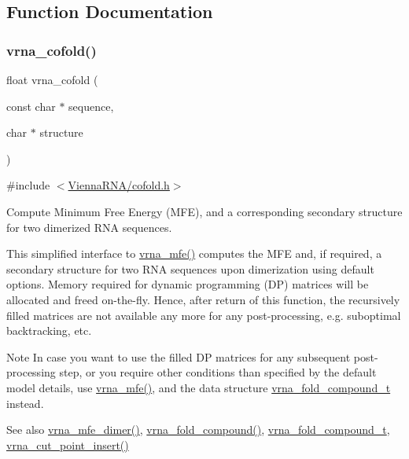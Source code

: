 \subsection{Function Documentation}
\mbox{\label{group__mfe__cofold_ga9ef3a297201dbf838a8daff2b45c0c82}} 
\subsubsection{\texorpdfstring{vrna\+\_\+cofold()}{vrna\_cofold()}}
{\footnotesize\ttfamily float vrna\+\_\+cofold (\begin{DoxyParamCaption}\item[{const char $\ast$}]{sequence,  }\item[{char $\ast$}]{structure }\end{DoxyParamCaption})}



{\ttfamily \#include $<$\hyperlink{cofold_8h}{Vienna\+R\+N\+A/cofold.\+h}$>$}



Compute Minimum Free Energy (M\+FE), and a corresponding secondary structure for two dimerized R\+NA sequences. 

This simplified interface to \hyperlink{group__mfe__fold_gabd3b147371ccf25c577f88bbbaf159fd}{vrna\+\_\+mfe()} computes the M\+FE and, if required, a secondary structure for two R\+NA sequences upon dimerization using default options. Memory required for dynamic programming (DP) matrices will be allocated and free\textquotesingle{}d on-\/the-\/fly. Hence, after return of this function, the recursively filled matrices are not available any more for any post-\/processing, e.\+g. suboptimal backtracking, etc.

\begin{DoxyNote}{Note}
In case you want to use the filled DP matrices for any subsequent post-\/processing step, or you require other conditions than specified by the default model details, use \hyperlink{group__mfe__fold_gabd3b147371ccf25c577f88bbbaf159fd}{vrna\+\_\+mfe()}, and the data structure \hyperlink{group__fold__compound_ga1b0cef17fd40466cef5968eaeeff6166}{vrna\+\_\+fold\+\_\+compound\+\_\+t} instead.
\end{DoxyNote}
\begin{DoxySeeAlso}{See also}
\hyperlink{group__mfe__cofold_gaab22d10c1190f205f16a77cab9d5d3ee}{vrna\+\_\+mfe\+\_\+dimer()}, \hyperlink{group__fold__compound_ga6601d994ba32b11511b36f68b08403be}{vrna\+\_\+fold\+\_\+compound()}, \hyperlink{group__fold__compound_ga1b0cef17fd40466cef5968eaeeff6166}{vrna\+\_\+fold\+\_\+compound\+\_\+t}, \hyperlink{group__string__utils_ga74f05ece32ea73b59f84a7452afd5fae}{vrna\+\_\+cut\+\_\+point\+\_\+insert()}
\end{DoxySeeAlso}

